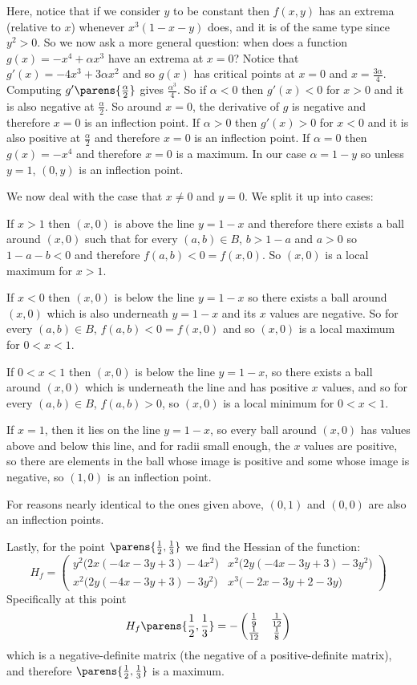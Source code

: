 \documentclass[10pt]{article}
\def\pmat#1{\begin{pmatrix} #1 \end{pmatrix}}
\begin{document}
    Here, notice that if we consider $y$ to be constant then $f(x,y)$ has an extrema (relative to $x$) whenever $x^3(1-x-y)$ does, and it is of the same type since $y^2>0$.
    So we now ask a more general question: when does a function $g(x)=-x^4+\alpha x^3$ have an extrema at $x=0$?
    Notice that $g'(x)=-4x^3+3\alpha x^2$ and so $g(x)$ has critical points at $x=0$ and $x=\frac{3\alpha}4$.
    Computing $g'\parens{\frac\alpha2}$ gives $\frac{\alpha^3}4$.
    So if $\alpha<0$ then $g'(x)<0$ for $x>0$ and it is also negative at $\frac\alpha2$. 
    So around $x=0$, the derivative of $g$ is negative and therefore $x=0$ is an inflection point.
    If $\alpha>0$ then $g'(x)>0$ for $x<0$ and it is also positive at $\frac\alpha2$ and therefore $x=0$ is an inflection point.
    If $\alpha=0$ then $g(x)=-x^4$ and therefore $x=0$ is a maximum.
    In our case $\alpha=1-y$ so unless $y=1$, $(0,y)$ is an inflection point.

    We now deal with the case that $x\neq0$ and $y=0$.
    We split it up into cases:
    \blist
        \item If $x>1$ then $(x,0)$ is above the line $y=1-x$ and therefore there exists a ball around $(x,0)$ such that for every $(a,b)\in B$, $b>1-a$ and $a>0$ so $1-a-b<0$ and therefore
        $f(a,b)<0=f(x,0)$.
        So $(x,0)$ is a local maximum for $x>1$.
        \item If $x<0$ then $(x,0)$ is below the line $y=1-x$ so there exists a ball around $(x,0)$ which is also underneath $y=1-x$ and its $x$ values are negative.
        So for every $(a,b)\in B$, $f(a,b)<0=f(x,0)$ and so $(x,0)$ is a local maximum for $0<x<1$.
        \item If $0<x<1$ then $(x,0)$ is below the line $y=1-x$, so there exists a ball around $(x,0)$ which is underneath the line and has positive $x$ values, and so for every $(a,b)\in B$, $f(a,b)>0$,
        so $(x,0)$ is a local minimum for $0<x<1$.
        \item If $x=1$, then it lies on the line $y=1-x$, so every ball around $(x,0)$ has values above and below this line, and for radii small enough, the $x$ values are positive, so there are elements in
        the ball whose image is positive and some whose image is negative, so $(1,0)$ is an inflection point.
        \item For reasons nearly identical to the ones given above, $(0,1)$ and $(0,0)$ are also an inflection points.
    \elist

    Lastly, for the point $\parens{\frac12,\frac13}$ we find the Hessian of the function:
    \[ H_f = \pmat{y^2\bigl(2x(-4x-3y+3)-4x^2\bigr) & x^2\bigl(2y(-4x-3y+3)-3y^2\bigr) \\ x^2\bigl(2y(-4x-3y+3)-3y^2\bigr) & x^3\bigl(-2x-3y+2-3y\bigr)} \]
    Specifically at this point
    \[ H_f\parens{\frac12,\frac13} = -\pmat{\frac19 & \frac1{12} \\ \frac1{12} & \frac18} \]
    which is a negative-definite matrix (the negative of a positive-definite matrix), and therefore $\parens{\frac12,\frac13}$ is a maximum.
\end{document}
